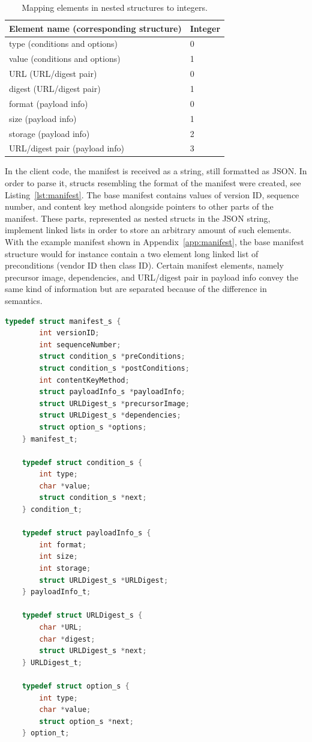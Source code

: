 \documentclass[0-thesis.tex]{subfiles}
\begin{document}
\begin{longtable}[]{@{}ll@{}}
    \caption{Mapping elements in nested structures to integers.}
    \label{tab:nested-substitution}\\
    \toprule
    Element name (corresponding structure) & Integer\tabularnewline
    \midrule
    \endhead
    type (conditions and options) & 0\tabularnewline
    value (conditions and options) & 1\tabularnewline
    \bottomrule
    URL (URL/digest pair) & 0\tabularnewline
    digest (URL/digest pair) & 1\tabularnewline
    \bottomrule
    format (payload info) & 0\tabularnewline
    size (payload info) & 1\tabularnewline
    storage (payload info) & 2\tabularnewline
    URL/digest pair (payload info) & 3\tabularnewline
    \bottomrule
\end{longtable}

In the client code, the manifest is received as a string, still formatted as JSON. In
order to parse it, structs resembling the format of the manifest were created, see
Listing~\ref{lst:manifest}. The base manifest contains values of version ID, sequence
number, and content key method alongside pointers to other parts of the manifest. These
parts, represented as nested structs in the JSON string, implement linked lists in order
to store an arbitrary amount of such elements. With the example manifest shown in
Appendix~\ref{app:manifest}, the base manifest structure would for instance contain a two
element long linked list of preconditions (vendor ID then class ID). Certain manifest
elements, namely precursor image, dependencies, and URL/digest pair in payload info convey
the same kind of information but are separated because of the difference in semantics.

\begin{lstlisting}[language=c, caption={The client manifest implementation}, label=lst:manifest]
    typedef struct manifest_s {
        int versionID;
        int sequenceNumber;
        struct condition_s *preConditions;
        struct condition_s *postConditions;
        int contentKeyMethod;
        struct payloadInfo_s *payloadInfo;
        struct URLDigest_s *precursorImage;
        struct URLDigest_s *dependencies;
        struct option_s *options;
    } manifest_t;

    typedef struct condition_s {
        int type;
        char *value;
        struct condition_s *next;
    } condition_t;

    typedef struct payloadInfo_s {
        int format;
        int size;
        int storage;
        struct URLDigest_s *URLDigest;
    } payloadInfo_t;

    typedef struct URLDigest_s {
        char *URL;
        char *digest;
        struct URLDigest_s *next;
    } URLDigest_t;

    typedef struct option_s {
        int type;
        char *value;
        struct option_s *next;
    } option_t;
\end{lstlisting}
\end{document}
